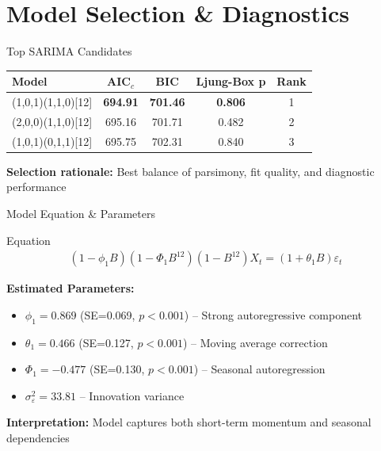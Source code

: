 \documentclass[10pt]{beamer}
\begin{document}
\section{Model Selection \& Diagnostics}

\begin{frame}{Top SARIMA Candidates}
\begin{table}[h]
\centering
\small
\begin{tabular}{lcccc}
\toprule
\textbf{Model} & AIC$_c$ & BIC & Ljung-Box p & Rank \\
\midrule
(1,0,1)(1,1,0)[12] & \textbf{694.91} & \textbf{701.46} & \textbf{0.806} & 1 \\
(2,0,0)(1,1,0)[12] & 695.16 & 701.71 & 0.482 & 2 \\
(1,0,1)(0,1,1)[12] & 695.75 & 702.31 & 0.840 & 3 \\
\bottomrule
\end{tabular}
\end{table}

\vspace{0.2cm}

\vspace{0.2cm}
\textbf{Selection rationale:} Best balance of parsimony, fit quality, and diagnostic performance
\end{frame}

\begin{frame}{Model Equation \& Parameters}
\begin{block}{Equation}
\begin{align*}
(1 - \phi_1 B)(1 - \Phi_1 B^{12})(1 - B^{12})X_t = (1 + \theta_1 B)\varepsilon_t
\end{align*}
\end{block}

\textbf{Estimated Parameters:}
\begin{itemize}
\item $\phi_1 = 0.869$ (SE=0.069, $p<0.001$) -- Strong autoregressive component
\item $\theta_1 = 0.466$ (SE=0.127, $p<0.001$) -- Moving average correction
\item $\Phi_1 = -0.477$ (SE=0.130, $p<0.001$) -- Seasonal autoregression
\item $\sigma^2_\varepsilon = 33.81$ -- Innovation variance
\end{itemize}

\textbf{Interpretation:} Model captures both short-term momentum and seasonal dependencies
\end{frame}
\end{document}
